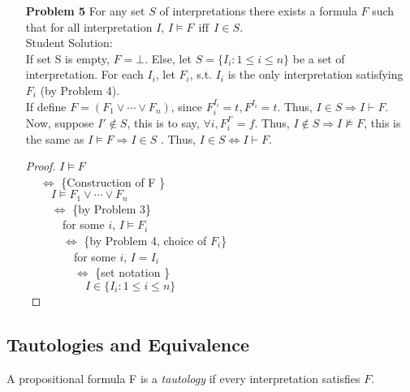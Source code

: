 \begin{enumerate}
\item[\textbf{Problem 5}] For any set $S$ of interpretations there exists a formula $F$ such that for all interpretation $I$, $I \models F ~~\text{iff}~~ I \in S$. \\
Student Solution: \\
If set S is empty, $F = \bot$. Else, let $S = \{ I_i :1 \leq i \leq n \}$ be a set of interpretation. For each $I_i$, let $F_i$, s.t. $I_i$ is the only interpretation satisfying $F_i$ (by Problem 4).  \\
If define $F = (F_1 \vee \cdots \vee F_n)$, since $F_i^{I_i} = t, F^{I_i} = t$. Thus, $I \in S \Rightarrow I \vdash F$. \\
Now, suppose $I' \notin S$, this is to say, $\forall i, F_i^{I'} = f$. Thus,  $I \notin S \Rightarrow I \not\models F$, this is the same as $I \models F    \Rightarrow I \in S$ . 
Thus, $I \in S \iff I \vdash F$.\\

\begin{proof}
$I \models F$ \\
$~\quad \iff$  \{Construction of F \}\\
    $~\qquad I \models F_1 \vee \cdots \vee F_n $  \\
$~\qquad \iff$   \{by Problem 3\}  \\ 
    $~\qquad \quad$for some $i$, $I \models F_i$  \\
 $~\qquad \quad \iff$   \{by Problem 4, choice of $F_i$\}  \\ 
    $~\qquad \qquad$for some $i$, $I = I_i$  \\
 $~\qquad \qquad \iff$   \{set notation \}  \\ 
 $~\qquad \qquad \quad I \in \{  I_i :1 \leq i \leq n\}$   \\ 
\end{proof}
\end{enumerate}

\subsection{Tautologies and Equivalence}
A propositional formula F is a \textit{tautology} if every interpretation satisfies $F$.

